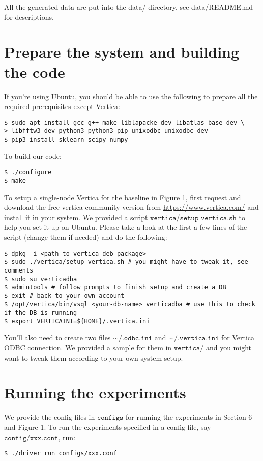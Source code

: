 \documentclass[11pt]{article}
\begin{document}
All the generated data are put into the data/ directory, see
data/README.md for descriptions.

\section{Prepare the system and building the code}
If you're using Ubuntu, you should be able to use the following to
prepare all the required prerequisites except Vertica:
\begin{verbatim}
$ sudo apt install gcc g++ make liblapacke-dev libatlas-base-dev \
> libfftw3-dev python3 python3-pip unixodbc unixodbc-dev
$ pip3 install sklearn scipy numpy
\end{verbatim}

To build our code:
\begin{verbatim}
$ ./configure
$ make
\end{verbatim}

To setup a single-node Vertica for the baseline in Figure 1, first
request and download the free vertica community version from
\url{https://www.vertica.com/} and install it in your system. We
provided a script $\texttt{vertica/setup\_vertica.sh}$ to help you set
it up on Ubuntu. Please take a look at the first a few lines of the
script (change them if needed) and do the following:
\begin{verbatim}
$ dpkg -i <path-to-vertica-deb-package>
$ sudo ./vertica/setup_vertica.sh # you might have to tweak it, see comments
$ sudo su verticadba
$ admintools # follow prompts to finish setup and create a DB
$ exit # back to your own account
$ /opt/vertica/bin/vsql <your-db-name> verticadba # use this to check if the DB is running
$ export VERTICAINI=${HOME}/.vertica.ini
\end{verbatim}
You'll also need to create two files $\mathtt{\sim/.odbc.ini}$ and
$\mathtt{\sim/.vertica.ini}$ for Vertica ODBC connection. We provided
a sample for them in $\texttt{vertica/}$ and you might want to tweak
them according to your own system setup.


\section{Running the experiments}


We provide the config files in $\texttt{configs}$ for running the
experiments in Section 6 and Figure 1. To run the experiments
specified in a config file, say $\texttt{config/xxx.conf}$, run:
\begin{verbatim}
$ ./driver run configs/xxx.conf
\end{verbatim}
\end{document}
